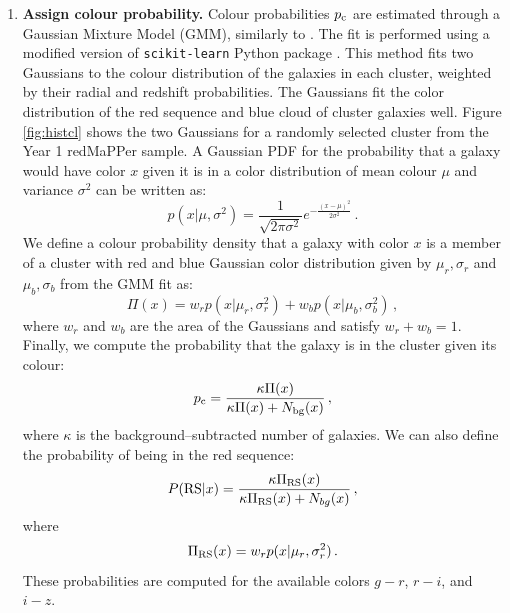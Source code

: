 \begin{enumerate}
\item {\bf Assign colour probability.} Colour probabilities $p_{\rm c}$ are estimated through a Gaussian Mixture Model (GMM), similarly to \citet{Hao2009PRECISIONMODEL}. The fit is performed using a modified version of \texttt{scikit-learn} Python package \citep{Pedregosa2011Scikit-learn:Python}. This method fits two Gaussians to the colour distribution of the galaxies in each cluster, weighted by their radial and redshift probabilities. The Gaussians fit the color distribution of the red sequence and blue cloud of cluster galaxies well. Figure \ref{fig:histcl} shows the two Gaussians for a randomly selected cluster from the Year 1 redMaPPer sample. A Gaussian PDF for the probability that a galaxy would have color $x$ given it is in a color distribution of mean colour $\mu$ and variance $\sigma^2$ can be written as:
\begin{equation} 
p(x | \mu,\sigma^2)= \frac{1}{\sqrt{2\pi\sigma^2}}e^{-\frac{(x-\mu)^2}{2\sigma ^2}} \,.
\end{equation} 
We define a colour probability density that a galaxy with color $x$ is a member of a cluster with red and blue Gaussian color distribution given by $\mu_r,\sigma_r$ and $\mu_b,\sigma_b$ from the GMM fit as:
\begin{equation}
\Pi(x)=w_r p(x | \mu_r,\sigma_r^2) + w_b p(x | \mu_b,\sigma_b^2)\,, \label{eq:pc}
\end{equation}
where $w_{r}$ and $w_{b}$ are the area of the Gaussians and satisfy $w_{ r}+w_{b}=1$. %
Finally, we compute the probability that the galaxy is in the cluster given its colour:
\begin{equation} 
p_{\rm c}=\frac{\kappa \Pi (x)} {\kappa \Pi (x) + N_{\rm bg}(x)}\, ,
\end{equation} 
where $\kappa$ is the background--subtracted number of galaxies.
We can also define the probability of being in the red sequence:
\begin{equation}
P({\rm RS}|x)=\frac{\kappa \Pi_{\rm RS}(x)} {\kappa \Pi_{\rm RS}(x) + N_{bg}(x)}\, ,\label{eq:prs}
\end{equation}
where
\begin{equation}
\Pi_{\rm RS}(x)=w_r p(x | \mu_r,\sigma^2_r)\, .
\end{equation}
These probabilities are computed for the available colors $g-r$, $r-i$, and $i-z$.
\end{enumerate}

